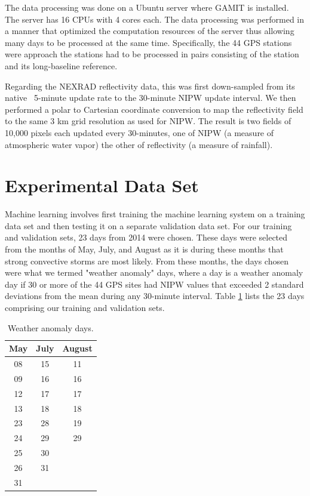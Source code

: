 \documentclass[proposal]{umassthesis}
\begin{document}
The data processing was done on a Ubuntu server where GAMIT is installed. The server has 16 CPUs with 4 cores each. The data processing was performed in a manner that optimized the computation resources of the server thus allowing many days to be processed at the same time. Specifically, the 44 GPS stations were approach the stations had to be processed in pairs consisting of the station and its long-baseline reference.

Regarding the NEXRAD reflectivity data, this was first down-sampled from its native ~5-minute update rate to the 30-minute NIPW update interval. We then performed a polar to Cartesian coordinate conversion to map the reflectivity field to the same 3 km grid resolution as used for NIPW. The result is two fields of 10,000 pixels each updated every 30-minutes, one of NIPW (a measure of atmospheric water vapor) the other of reflectivity (a measure of rainfall).

\section{Experimental Data Set}

Machine learning involves first training the machine learning system on a training data set and then testing it on a separate validation data set. For our training and validation sets, 23 days from 2014 were chosen. These days were selected from the months of May, July, and August as it is during these months that strong convective storms are most likely. From these months, the days chosen were what we termed "weather anomaly" days, where a day is a weather anomaly day if 30 or more of the 44 GPS sites had NIPW values that exceeded 2 standard deviations from the mean during any 30-minute interval. Table \ref{table:weather anomaly} lists the 23 days comprising our training and validation sets.

\begin{table}
\begin{center}
\caption{Weather anomaly days.}
\begin{tabular}{ |c|c|c| } 
 \hline
 May & July & August  \\ 
 \hline
 08 & 15 & 11 \\ 
 09 & 16 & 16 \\
 12 & 17 & 17 \\
 13 & 18 & 18 \\
 23 & 28 & 19 \\
 24 & 29 & 29 \\
 25 & 30 &      \\
 26 & 31 &      \\
 31 &     &       \\
\hline
\end{tabular}
\label{table:weather anomaly}
\end{center}
\end{table}
\end{document}
